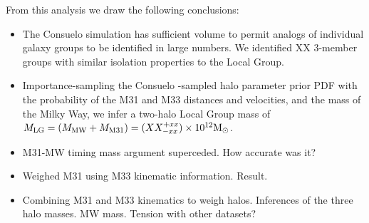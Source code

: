 \documentclass[iop,apj]{emulateapj}
\newcommand{\MMW}{{\rm M}_{\rm MW}}
\newcommand{\Msun}{{\rm M}_\odot}
\newcommand{\consuelo}{{\sc Consuelo }}
\def\MLG{M_{\rm LG}}
\def\MMW{M_{\rm MW}}
\def\MEI{M_{\rm M31}}
\def\MEE{M_{\rm M33}}
\def\MPAIRestimate{XX}
\def\MPAIRerrorplus{xx}
\def\MPAIRerrorminus{xx}
\def\MTRIPLETestimate{XX}
\def\MTRIPLETerrorplus{xx}
\def\MTRIPLETerrorminus{xxx}
\def\MEIestimate{XX}
\def\MEIerrorplus{xx}
\def\MEIerrorminus{xx}
\def\MEEestimate{XX}
\def\MEEerrorplus{xx}
\def\MEEerrorminus{xx}
\begin{document}
From this analysis we draw the following conclusions:
\begin{itemize}

\item The \consuelo simulation has sufficient volume to permit analogs of
individual galaxy groups to be identified in large numbers. We identified XX
3-member groups with similar isolation properties to the Local Group.

\item Importance-sampling the \consuelo-sampled halo parameter prior PDF with
the probability of the M31 and M33 distances and velocities, and the mass of
the Milky Way, we infer a two-halo Local Group mass of $\MLG = (\MMW + \MEI)
= (\MPAIRestimate^{+\MPAIRerrorplus}_{-\MPAIRerrorminus}) \times 10^{12}
\Msun$.

\item M31-MW timing mass argument superceded. How accurate was it? 

\item Weighed M31 using M33 kinematic information. Result.

\item Combining M31 and M33 kinematics to weigh halos. Inferences of the three
halo masses. MW mass. Tension with other datasets?

% 
% 

\end{itemize}

%
%



\nocite{*}

\end{document}

